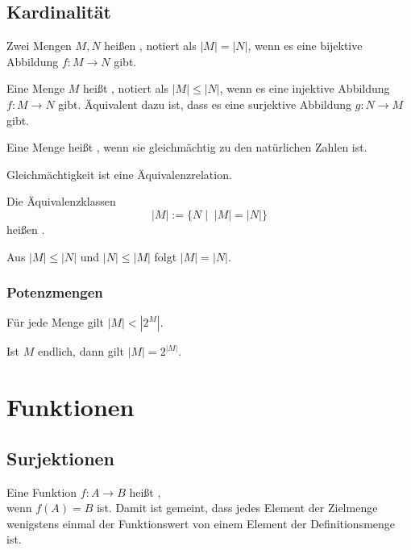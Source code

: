 \subsection{Kardinalität}
\begin{Definition}
Zwei Mengen $M,N$ heißen , notiert als
$|M|=|N|$, wenn es eine bijektive Abbildung $f\colon M\to N$ gibt.

Eine Menge $M$ heißt ,
notiert als $|M|\le|N|$, wenn es eine injektive Abbildung
$f\colon M\to N$ gibt. Äquivalent dazu ist, dass es eine
surjektive Abbildung $g\colon N\to M$ gibt.

Eine Menge heißt , wenn sie gleichmächtig
zu den natürlichen Zahlen ist.
\end{Definition}
Gleichmächtigkeit ist eine Äquivalenzrelation.
\begin{Definition}
Die Äquivalenzklassen
\begin{equation}
|M| := \{N\mid\;{\scriptstyle |M|=|N|}\}
\end{equation}
heißen .
\end{Definition}


Aus $|M|\le |N|$ und $|N|\le |M|$ folgt $|M|=|N|$.

\subsubsection{Potenzmengen}

Für jede Menge gilt $|M|<|2^M|$.

Ist $M$ endlich, dann gilt $|M|=2^{|M|}$.


\section{Funktionen}
\subsection{Surjektionen}
\begin{Definition}
Eine Funktion $f\colon A\to B$ heißt ,\\
wenn $f(A)=B$ ist. Damit ist gemeint, dass jedes Element
der Zielmenge wenigstens einmal der Funktionswert von einem
Element der Definitionsmenge ist.
\end{Definition}

